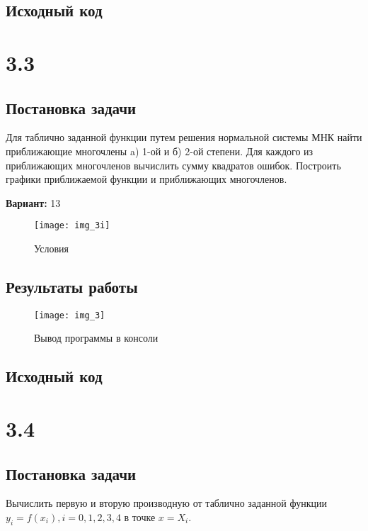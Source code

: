 \subsection{Исходный код}



\pagebreak

\section* {3.3}

\subsection{Постановка задачи}
Для таблично заданной функции путем решения нормальной системы МНК найти приближающие многочлены a) 1-ой  и б) 2-ой степени. Для каждого из приближающих многочленов вычислить сумму квадратов ошибок. Построить графики приближаемой функции и приближающих многочленов.

{\bfseries Вариант:} 13
\begin{figure}[h!]
\centering
\texttt{[image: img\_3i]}
\caption{Условия}
\end{figure}

\subsection{Результаты работы}
\begin{figure}[h!]
\centering
\texttt{[image: img\_3]}
\caption{Вывод программы в консоли}
\end{figure}
\pagebreak

\subsection{Исходный код}


\pagebreak

\section* {3.4}

\subsection{Постановка задачи}
Вычислить первую и вторую производную от таблично заданной функции $y_i=f(x_i), i=0,1,2,3,4$  в точке $x=X_i$.   

